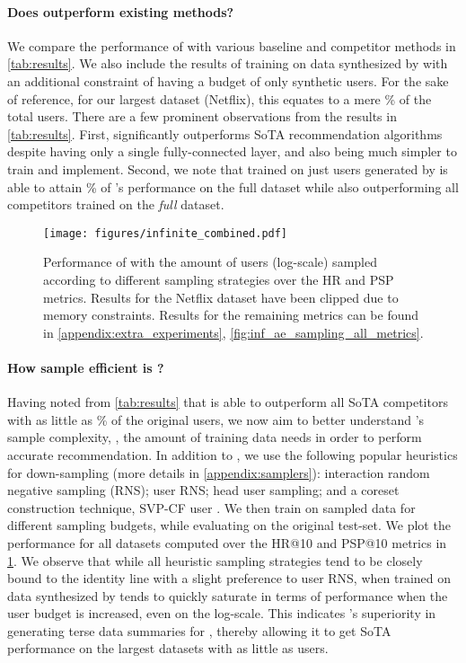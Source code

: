 \documentclass{article}
\begin{document}
\paragraph{Does \model outperform existing methods?} We compare the performance of \model with various baseline and competitor methods in \cref{tab:results}. We also include the results of training \model on data synthesized by \sampler with an additional constraint of having a budget of only  synthetic users. For the sake of reference, for our largest dataset (Netflix), this equates to a mere \% of the total users. There are a few prominent observations from the results in \cref{tab:results}. First, \model significantly outperforms SoTA recommendation algorithms despite having only a single fully-connected layer, and also being much simpler to train and implement. Second, we note that \model trained on just  users generated by \sampler is able to attain \% of \model's performance on the full dataset while also outperforming all competitors trained on the \emph{full} dataset. 

\begin{figure}[!t] 
    \texttt{[image: figures/infinite\_combined.pdf]}
    \caption{Performance of \model with the amount of users (log-scale) sampled according to different sampling strategies over the HR and PSP metrics. Results for the Netflix dataset have been clipped due to memory constraints. Results for the remaining metrics can be found in \cref{appendix:extra_experiments}, \cref{fig:inf_ae_sampling_all_metrics}.}
    \label{fig:inf_ae_sampling}
\end{figure}

\paragraph{How sample efficient is \model?} Having noted from \cref{tab:results} that \model is able to outperform all SoTA competitors with as little as \% of the original users, we now aim to better understand \model's sample complexity, \ie, the amount of training data \model needs in order to perform accurate recommendation. 
In addition to \sampler, we use the following popular heuristics for down-sampling (more details in \cref{appendix:samplers}): interaction random negative sampling (RNS); user RNS; head user sampling; and a coreset construction technique, SVP-CF user \cite{wsdm22}. We then train \model on sampled data for different sampling budgets, while evaluating on the original test-set. We plot the performance for all datasets computed over the HR@10 and PSP@10 metrics in \cref{fig:inf_ae_sampling}. We observe that while all heuristic sampling strategies tend to be closely bound to the identity line with a slight preference to user RNS, \model when trained on data synthesized by \sampler tends to 
quickly saturate in terms of performance when the user budget is increased, even on the log-scale.
This indicates \sampler's superiority in generating terse data summaries for \model, thereby allowing it to get SoTA performance on the largest datasets with as little as  users.
\end{document}
